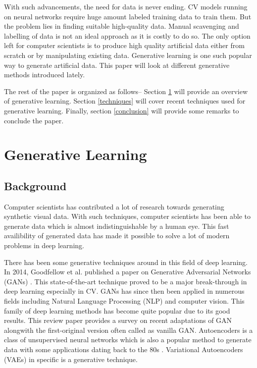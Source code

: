 \documentclass[conference]{IEEEtran}
\begin{document}
With such advancements, the need for data is never ending. CV models running on neural networks require huge amount labeled training data to train them. But the problem lies in finding suitable high-quality data. Manual scavenging and labelling of data is not an ideal approach as it is costly to do so. The only option left for computer scientists is to produce high quality artificial data either from scratch or by manipulating existing data. Generative learning is one such popular way to generate artificial data. This paper will look at different generative methods introduced lately.

The rest of the paper is organized as follows-- Section \ref{lr} will provide an overview of generative learning. Section \ref{techniques} will cover recent techniques used for generative learning. Finally, section \ref{conclusion} will provide some remarks to conclude the paper. 

\section{Generative Learning}
\label{lr}
\subsection{Background}
Computer scientists has contributed a lot of research towards generating synthetic visual data. With such techniques, computer scientists has been able to generate data which is almost indistinguishable by a human eye. This fast availibility of generated data has made it possible to solve a lot of modern problems in deep learning.

There has been some generative techniques around in this field of deep learning. In 2014, Goodfellow et al. published a paper on Generative Adversarial Networks (GANs) \cite{b1}. This state-of-the-art technique proved to be a major break-through in deep learning especially in CV. GANs has since then been applied in numerous fields including Natural Language Processing (NLP) and computer vision. This family of deep learning methods has become quite popular due to its good results. This review paper provides a survey on recent adaptations of GAN alongwith the first-original version often called as vanilla GAN. Autoencoders is a class of unsupervised neural networks which is also a popular method to generate data with some applications dating back to the 80s \cite{b2, b3}. Variational Autoencoders (VAEs) in specific is a generative technique.
\end{document}
